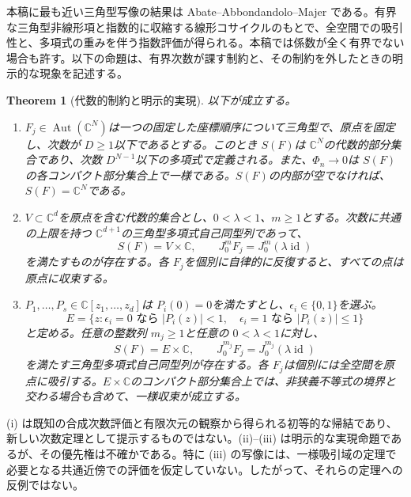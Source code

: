 \documentclass[12pt]{amsart}
\newtheorem{thm}{Theorem}[section]
\theoremstyle{definition}
\theoremstyle{remark}
\numberwithin{equation}{section}
\DeclareMathOperator{\Autop}{Aut}
\DeclareMathOperator{\id}{id}
\newcommand{\Aut}[1]{\Autop(#1)}
\newcommand{\C}{\mathbb{C}}
\begin{document}
本稿に最も近い三角型写像の結果は Abate--Abbondandolo--Majer \cite[Lemma 6.4]{AAM-ja} である。有界な三角型非線形項と指数的に収縮する線形コサイクルのもとで、全空間での吸引性と、多項式の重みを伴う指数評価が得られる。本稿では係数が全く有界でない場合も許す。以下の命題は、有界次数が課す制約と、その制約を外したときの明示的な現象を記述する。

\begin{thm}[代数的制約と明示的実現]\label{thm:main-ja}
以下が成立する。
\begin{enumerate}[label=\textup{(\roman*)},leftmargin=*]
\item \allowbreak$F_j\in\Aut{\C^N}$\allowbreak は一つの固定した座標順序について三角型で、原点を固定し、次数が \allowbreak$D\geq1$\allowbreak 以下であるとする。このとき \allowbreak$S(F)$\allowbreak は \allowbreak$\C^N$\allowbreak の代数的部分集合であり、次数 \allowbreak$D^{N-1}$\allowbreak 以下の多項式で定義される。また、\allowbreak$\Phi_n\to0$\allowbreak は \allowbreak$S(F)$\allowbreak の各コンパクト部分集合上で一様である。\allowbreak$S(F)$\allowbreak の内部が空でなければ、\allowbreak$S(F)=\C^N$\allowbreak である。
\item \allowbreak$V\subset\C^d$\allowbreak を原点を含む代数的集合とし、\allowbreak$0<\lambda<1$\allowbreak、\allowbreak$m\geq1$\allowbreak とする。次数に共通の上限を持つ \allowbreak$\C^{d+1}$\allowbreak の三角型多項式自己同型列であって、
\[
S(F)=V\times\C,\qquad J_0^m F_j=J_0^m(\lambda\id)
\]
を満たすものが存在する。各 \allowbreak$F_j$\allowbreak を個別に自律的に反復すると、すべての点は原点に収束する。
\item \allowbreak$P_1,\ldots,P_s\in\C[z_1,\ldots,z_d]$\allowbreak は \allowbreak$P_i(0)=0$\allowbreak を満たすとし、\allowbreak$\epsilon_i\in\{0,1\}$\allowbreak を選ぶ。
\begin{equation}\label{eq:target-ja}
E=\{z: \epsilon_i=0\text{ なら }|P_i(z)|<1,
\quad \epsilon_i=1\text{ なら }|P_i(z)|\leq1\}
\end{equation}
と定める。任意の整数列 \allowbreak$m_j\geq1$\allowbreak と任意の \allowbreak$0<\lambda<1$\allowbreak に対し、
\[
S(F)=E\times\C,\qquad J_0^{m_j}F_j=J_0^{m_j}(\lambda\id)
\]
を満たす三角型多項式自己同型列が存在する。各 \allowbreak$F_j$\allowbreak は個別には全空間を原点に吸引する。\allowbreak$E\times\C$\allowbreak のコンパクト部分集合上では、非狭義不等式の境界と交わる場合も含めて、一様収束が成立する。
\end{enumerate}
\end{thm}

(i) は既知の合成次数評価と有限次元の観察から得られる初等的な帰結であり、新しい次数定理として提示するものではない。(ii)--(iii) は明示的な実現命題であるが、その優先権は不確かである。特に (iii) の写像には、一様吸引域の定理で必要となる共通近傍での評価を仮定していない。したがって、それらの定理への反例ではない。
\end{document}

